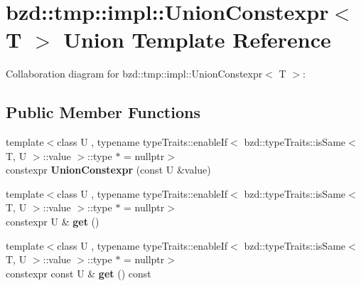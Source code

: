 \hypertarget{unionbzd_1_1tmp_1_1impl_1_1UnionConstexpr_3_01T_01_4}{}\section{bzd\+:\+:tmp\+:\+:impl\+:\+:Union\+Constexpr$<$ T $>$ Union Template Reference}
\label{unionbzd_1_1tmp_1_1impl_1_1UnionConstexpr_3_01T_01_4}


Collaboration diagram for bzd\+:\+:tmp\+:\+:impl\+:\+:Union\+Constexpr$<$ T $>$\+:
\subsection*{Public Member Functions}
\begin{DoxyCompactItemize}
\item 
\mbox{\label{unionbzd_1_1tmp_1_1impl_1_1UnionConstexpr_3_01T_01_4_a5602dbec169fa69e91c522a5e6ba22cf}} 
{\footnotesize template$<$class U , typename type\+Traits\+::enable\+If$<$ bzd\+::type\+Traits\+::is\+Same$<$ T, U $>$\+::value $>$\+::type $\ast$  = nullptr$>$ }\\constexpr {\bfseries Union\+Constexpr} (const U \&value)
\item 
\mbox{\label{unionbzd_1_1tmp_1_1impl_1_1UnionConstexpr_3_01T_01_4_aa410697c37ba69e9b4a8b7e059621788}} 
{\footnotesize template$<$class U , typename type\+Traits\+::enable\+If$<$ bzd\+::type\+Traits\+::is\+Same$<$ T, U $>$\+::value $>$\+::type $\ast$  = nullptr$>$ }\\constexpr U \& {\bfseries get} ()
\item 
\mbox{\label{unionbzd_1_1tmp_1_1impl_1_1UnionConstexpr_3_01T_01_4_a5557fef71090f30fa4ca8a52375d61f9}} 
{\footnotesize template$<$class U , typename type\+Traits\+::enable\+If$<$ bzd\+::type\+Traits\+::is\+Same$<$ T, U $>$\+::value $>$\+::type $\ast$  = nullptr$>$ }\\constexpr const U \& {\bfseries get} () const
\end{DoxyCompactItemize}
